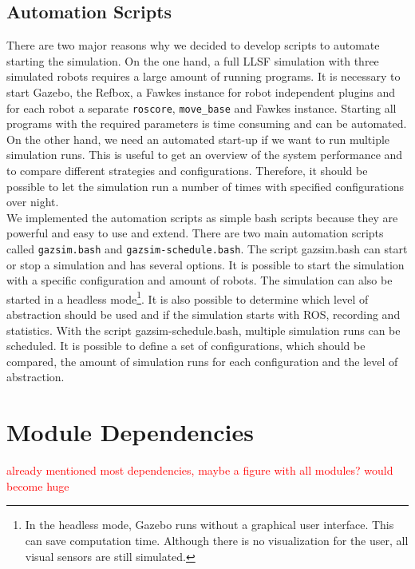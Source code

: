 \subsection{Automation Scripts}
There are two major reasons why we decided to develop scripts to automate starting the simulation. On the one hand, a full LLSF simulation with three simulated robots requires a large amount of running programs. It is necessary to start Gazebo, the Refbox, a Fawkes instance for robot independent plugins and for each robot a separate \texttt{roscore}, \texttt{move\_base} and Fawkes instance. Starting all programs with the required parameters is time consuming and can be automated. On the other hand, we need an automated start-up if we want to run multiple simulation runs. This is useful to get an overview of the system performance and to compare different strategies and configurations. Therefore, it should be possible to let the simulation run a number of times with specified configurations over night.\\
We implemented the automation scripts as simple bash scripts because they are powerful and easy to use and extend. There are two main automation scripts called \texttt{gazsim.bash} and \texttt{gazsim-schedule.bash}. The script gazsim.bash can start or stop a simulation and has several options. It is possible to start the simulation with a specific configuration and amount of robots. The simulation can also be started in a headless mode\footnote{In the headless mode, Gazebo runs without a graphical user interface. This can save computation time. Although there is no visualization for the user, all visual sensors are still simulated.}. It is also possible to determine which level of abstraction should be used and if the simulation starts with ROS, recording and statistics. With the script gazsim-schedule.bash, multiple simulation runs can be scheduled. It is possible to define a set of configurations, which should be compared, the amount of simulation runs for each configuration and the level of abstraction.

\section{Module Dependencies}
\label{sec:module_dependencies}
\textcolor{red}{already mentioned most dependencies, maybe a figure with all modules? would become huge}


